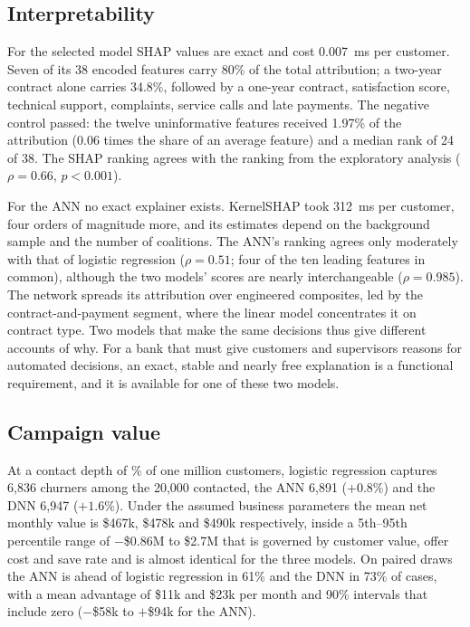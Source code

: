 \documentclass[conference]{IEEEtran}
\begin{document}
\subsection{Interpretability}
For the selected model SHAP values are exact and cost 0.007~ms per customer. Seven of its 38 encoded features carry 80\% of the total attribution; a two-year contract alone carries 34.8\%, followed by a one-year contract, satisfaction score, technical support, complaints, service calls and late payments. The negative control passed: the twelve uninformative features received 1.97\% of the attribution (0.06 times the share of an average feature) and a median rank of 24 of 38. The SHAP ranking agrees with the ranking from the exploratory analysis ($\rho=0.66$, $p<0.001$).

For the ANN no exact explainer exists. KernelSHAP took 312~ms per customer, four orders of magnitude more, and its estimates depend on the background sample and the number of coalitions. The ANN's ranking agrees only moderately with that of logistic regression ($\rho=0.51$; four of the ten leading features in common), although the two models' scores are nearly interchangeable ($\rho=0.985$). The network spreads its attribution over engineered composites, led by the contract-and-payment segment, where the linear model concentrates it on contract type. Two models that make the same decisions thus give different accounts of why. For a bank that must give customers and supervisors reasons for automated decisions, an exact, stable and nearly free explanation is a functional requirement, and it is available for one of these two models.

\subsection{Campaign value}
At a contact depth of \CampaignSharePct\% of one million customers, logistic regression captures 6,836 churners among the 20,000 contacted, the ANN 6,891 ($+0.8\%$) and the DNN 6,947 ($+1.6\%$). Under the assumed business parameters the mean net monthly value is \$467k, \$478k and \$490k respectively, inside a 5th--95th percentile range of $-$\$0.86M to \$2.7M that is governed by customer value, offer cost and save rate and is almost identical for the three models. On paired draws the ANN is ahead of logistic regression in 61\% and the DNN in 73\% of cases, with a mean advantage of \$11k and \$23k per month and 90\% intervals that include zero ($-$\$58k to $+$\$94k for the ANN).
\end{document}
